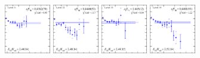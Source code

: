 \begin{figure}[H]
    \includegraphics[width=0.18\textwidth]{figures/sigmas/hg/fits/fit_19.pdf}
    \includegraphics[width=0.18\textwidth]{figures/sigmas/hg/fits/fit_7.pdf}
    \includegraphics[width=0.18\textwidth]{figures/sigmas/hg/fits/fit_21.pdf}
    \includegraphics[width=0.18\textwidth]{figures/sigmas/hg/fits/fit_24.pdf}\\

\end{figure}
